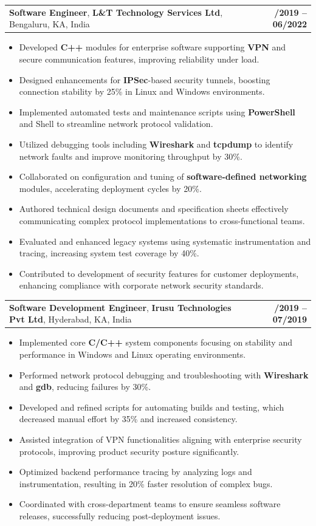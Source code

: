 \documentclass[letterpaper,11pt]{article}
\makeatletter
\newcommand{\resumeItem}[1]{
  \item\footnotesize{
    {#1 \vspace{-2pt}}
  }
}
\newcommand{\resumeSubheading}[4]{
  \vspace{-2pt}\item
    \begin{tabular*}{1.0\textwidth}[t]{l@{\extracolsep{\fill}}r}
      \textbf{\fontsize{10pt}{14pt}\selectfont #3}, \textbf{\fontsize{10pt}{14pt}\selectfont #1}, \fontsize{10pt}{14pt}\selectfont #4 & \textbf{\fontsize{10pt}{14pt}\selectfont #2} \\
    \end{tabular*}\vspace{-7pt}
}
\newcommand{\resumeItemListStart}{\begin{itemize}[leftmargin=*]}
\newcommand{\resumeItemListEnd}{\end{itemize}\vspace{-5pt}}
\makeatother
\begin{document}
    \resumeSubheading
        {L\&T Technology Services Ltd}{08/2019 -- 06/2022}
        {Software Engineer}{Bengaluru, KA, India}
      \resumeItemListStart
        \resumeItem{Developed \textbf{C++} modules for enterprise software supporting \textbf{VPN} and secure communication features, improving reliability under load.}
        \resumeItem{Designed enhancements for \textbf{IPSec}-based security tunnels, boosting connection stability by 25\% in Linux and Windows environments.}
        \resumeItem{Implemented automated tests and maintenance scripts using \textbf{PowerShell} and Shell to streamline network protocol validation.}
        \resumeItem{Utilized debugging tools including \textbf{Wireshark} and \textbf{tcpdump} to identify network faults and improve monitoring throughput by 30\%.}
        \resumeItem{Collaborated on configuration and tuning of \textbf{software-defined networking} modules, accelerating deployment cycles by 20\%.}
        \resumeItem{Authored technical design documents and specification sheets effectively communicating complex protocol implementations to cross-functional teams.}
        \resumeItem{Evaluated and enhanced legacy systems using systematic instrumentation and tracing, increasing system test coverage by 40\%.}
        \resumeItem{Contributed to development of security features for customer deployments, enhancing compliance with corporate network security standards.}
      \resumeItemListEnd

    \resumeSubheading
        {Irusu Technologies Pvt Ltd}{01/2019 -- 07/2019}
        {Software Development Engineer}{Hyderabad, KA, India}
      \resumeItemListStart
        \resumeItem{Implemented core \textbf{C/C++} system components focusing on stability and performance in Windows and Linux operating environments.}
        \resumeItem{Performed network protocol debugging and troubleshooting with \textbf{Wireshark} and \textbf{gdb}, reducing failures by 30\%.}
        \resumeItem{Developed and refined scripts for automating builds and testing, which decreased manual effort by 35\% and increased consistency.}
        \resumeItem{Assisted integration of VPN functionalities aligning with enterprise security protocols, improving product security posture significantly.}
        \resumeItem{Optimized backend performance tracing by analyzing logs and instrumentation, resulting in 20\% faster resolution of complex bugs.}
        \resumeItem{Coordinated with cross-department teams to ensure seamless software releases, successfully reducing post-deployment issues.}
      \resumeItemListEnd
\end{document}
